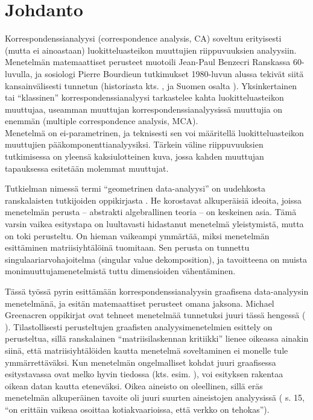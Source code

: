 \section{Johdanto}
\label{dispjohd1}



Korrespondenssianalyysi (correspondence analysis, CA) soveltuu erityisesti (mutta ei ainoastaan) luokitteluasteikon muuttujien riippuvuuksien analyysiin.  Menetelmän matemaattiset perusteet muotoili Jean-Paul Benzecri Ranskassa 60-luvulla, ja sosiologi Pierre Bourdieun tutkimukset 1980-luvun alussa tekivät siitä kansainvälisesti tunnetun (historiasta kts. \cite {RefWorks:70}, \cite {RefWorks:68} ja Suomen osalta \cite {RefWorks:74}). Yksinkertainen tai ``klassinen'' korrespondenssianalyysi tarkastelee kahta luokitteluasteikon muuttujaa, useamman muuttujan korrespondenssianalyysissä muuttujia on enemmän (multiple correspondence analysis, MCA). \\

Menetelmä on ei-parametrinen, ja teknisesti sen voi määritellä luokitteluasteikon muuttujien pääkomponenttianalyysiksi. Tärkein väline riippuvuuksien tutkimisessa on yleensä kaksiulotteinen kuva, jossa kahden muuttujan tapauksessa esitetään molemmat muuttujat.

Tutkielman nimessä termi ``geometrinen data-analyysi'' on uudehkosta ranskalaisten tutkijoiden oppikirjasta \cite {RefWorks:68}. He korostavat alkuperäisiä ideoita, joissa menetelmän perusta -- abstrakti algebrallinen teoria -- on keskeinen asia. Tämä varsin vaikea esitystapa on luultavasti hidastanut menetelmä yleistymistä, mutta on toki perusteltu. On hieman vaikeampi ymmärtää, miksi menetelmän esittäminen matriisiyhtälöinä tuomitaan. Sen perusta on tunnettu singulaariarvohajoitelma (singular value dekomposition), ja tavoitteena on muista monimuuttujamenetelmistä tuttu dimensioiden vähentäminen.

\bigskip

Tässä työssä pyrin esittämään korrespondenssianalyysin graafisena data-analyysin menetelmänä, ja esitän matemaattiset perusteet omana jaksona. 
Michael Greenacren oppikirjat ovat tehneet menetelmää tunnetuksi juuri tässä hengessä (\cite {RefWorks:55} ). Tilastollisesti perusteltujen graafisten analyysimenetelmien esittely on perusteltua, sillä ranskalainen ``matriisilaskennan kritiikki'' lienee oikeassa ainakin siinä, että matriisiyhtälöiden kautta menetelmä soveltaminen ei monelle tule ymmärrettäväksi. Kun menetelmän ongelmalliset kohdat juuri graafisessa esitystavassa ovat melko hyvin tiedossa (kts. esim. \cite {RefWorks:73}), voi esityksen rakentaa oikean datan kautta eteneväksi. Oikea aineisto on oleellinen, sillä eräs menetelmän alkuperäinen tavoite oli juuri suurten aineistojen analyysissä ( \cite {RefWorks:68} s. 15, ``on erittäin vaikeaa osoittaa kotiakvaarioissa, että verkko on tehokas'').\\

